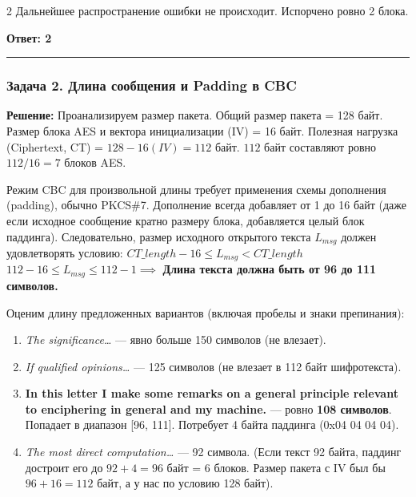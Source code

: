 ﻿\documentclass[10pt,a4paper,landscape]{extarticle}
\newcommand{\tightlist}{}
\begin{document}
\begin{multicols*}{2}
Дальнейшее распространение ошибки не происходит. Испорчено ровно 2 блока.

\textbf{Ответ: 2}

\begin{center}\rule{0.5\linewidth}{0.5pt}\end{center}

\subsubsection{Задача 2. Длина сообщения и Padding в CBC}\label{ux437ux430ux434ux430ux447ux430-2.-ux434ux43bux438ux43dux430-ux441ux43eux43eux431ux449ux435ux43dux438ux44f-ux438-padding-ux432-cbc}

\textbf{Решение:} Проанализируем размер пакета. Общий размер пакета = 128 байт. Размер блока AES и вектора инициализации (IV) = 16 байт. Полезная нагрузка (Ciphertext, CT) = \(128 - 16 (IV) = 112\) байт. \(112\) байт составляют ровно \(112 / 16 = 7\) блоков AES.

Режим CBC для произвольной длины требует применения схемы дополнения (padding), обычно PKCS\#7. Дополнение всегда добавляет от 1 до 16 байт (даже если исходное сообщение кратно размеру блока, добавляется целый блок паддинга). Следовательно, размер исходного открытого текста \(L_{msg}\) должен удовлетворять условию: \(CT\_length - 16 \le L_{msg} < CT\_length\) \(112 - 16 \le L_{msg} \le 112 - 1 \implies\) \textbf{Длина текста должна быть от 96 до 111 символов.}

Оценим длину предложенных вариантов (включая пробелы и знаки препинания):

\begin{enumerate}
\def\labelenumi{\arabic{enumi}.}
\tightlist
\item
  \emph{The significance\ldots{}} --- явно больше 150 символов (не влезает).
\item
  \emph{If qualified opinions\ldots{}} --- 125 символов (не влезает в 112 байт шифротекста).
\item
  \textbf{In this letter I make some remarks on a general principle relevant to enciphering in general and my machine.} --- ровно \textbf{108 символов}. Попадает в диапазон {[}96, 111{]}. Потребует 4 байта паддинга (0x04 04 04 04).
\item
  \emph{The most direct computation\ldots{}} --- 92 символа. (Если текст 92 байта, паддинг достроит его до \(92+4 = 96\) байт = 6 блоков. Размер пакета с IV был бы \(96+16 = 112\) байт, а у нас по условию 128 байт).
\end{enumerate}


\end{multicols*}
\end{document}
